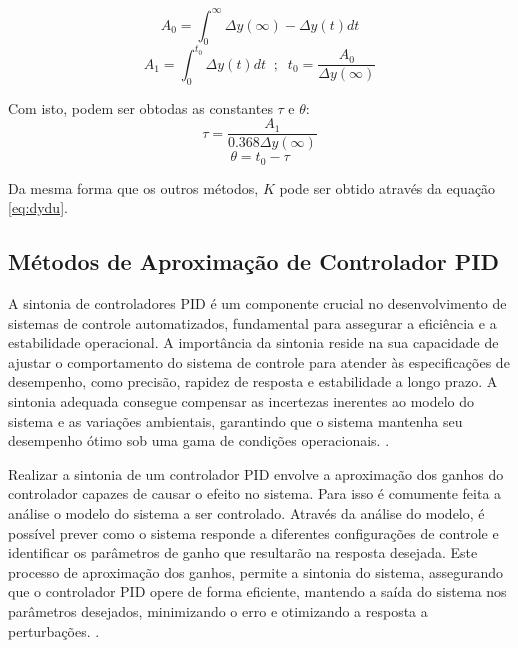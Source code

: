 \begin{equation}
    \label{eq:nia0}
    A_0 = \int_{0}^{\infty} { \Delta y(\infty) - \Delta y(t) } dt
\end{equation}
\begin{equation}
    \label{eq:nia1nt0}
    A_1 = \int_{0}^{t_0} \Delta y(t) dt \;\; ; \;\; t_0 = \frac{A_0}{\Delta y(\infty)}
\end{equation}

Com isto, podem ser obtodas as constantes $\tau$ e $\theta$:
\begin{equation}
    \label{eq:nitau}
    \tau = \frac{A_1}{0.368\Delta y(\infty)}
\end{equation}
\begin{equation}
    \label{eq:nitheta}
    \theta = t_0 - \tau
\end{equation}

Da mesma forma que os outros métodos, $K$ pode ser obtido através da equação \eqref{eq:dydu}.

\subsection{Métodos de Aproximação de Controlador PID}

A sintonia de controladores PID é um componente crucial no desenvolvimento de sistemas de controle automatizados,
fundamental para assegurar a eficiência e a estabilidade operacional.
A importância da sintonia reside na sua capacidade de ajustar o comportamento do sistema de controle para atender às
especificações de desempenho, como precisão, rapidez de resposta e estabilidade a longo prazo.
A sintonia adequada consegue compensar as incertezas inerentes ao modelo do sistema e as variações ambientais,
garantindo que o sistema mantenha seu desempenho ótimo sob uma gama de condições operacionais.
\cite{apostpidsint}.

Realizar a sintonia de um controlador PID envolve a aproximação dos ganhos do controlador capazes de causar o efeito no
sistema.
Para isso é comumente feita a análise o modelo do sistema a ser controlado.
Através da análise do modelo, é possível prever como o sistema responde a diferentes configurações de controle e
identificar os parâmetros de ganho que resultarão na resposta desejada.
Este processo de aproximação dos ganhos, permite a sintonia do sistema, assegurando que o controlador PID opere de forma
eficiente, mantendo a saída do sistema nos parâmetros desejados, minimizando o erro e otimizando a resposta a
perturbações. \cite{apostpidsint}.

